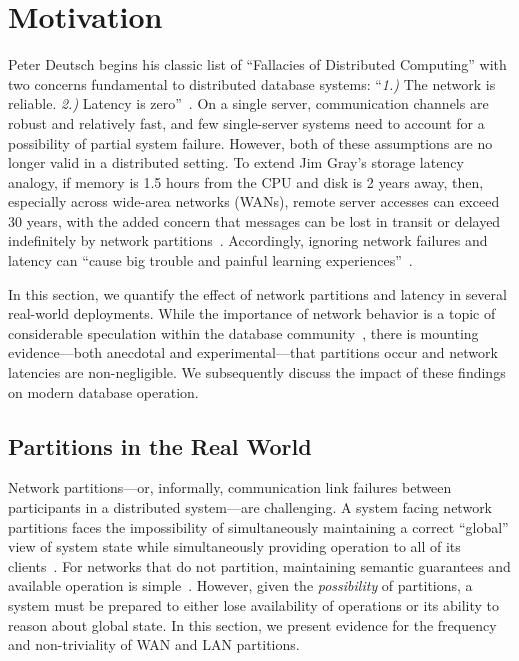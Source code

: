
\section{Motivation}
\label{sec:motivation}

Peter Deutsch begins his classic list of ``Fallacies of Distributed
Computing'' with two concerns fundamental to distributed database
systems: ``\textit{1.)}  The network is reliable. \textit{2.)} Latency
is zero''~\cite{fallacies-deutsch}. On a single server, communication
channels are robust and relatively fast, and few single-server systems
need to account for a possibility of partial system failure. However,
both of these assumptions are no longer valid in a distributed
setting. To extend Jim Gray's storage latency analogy, if memory is
1.5 hours from the CPU and disk is 2 years away, then, especially
across wide-area networks (WANs), remote server accesses can exceed 30
years, with the added concern that messages can be lost in transit or
delayed indefinitely by network
partitions~\cite{gray-rules}. Accordingly, ignoring network failures
and latency can ``cause big trouble and painful learning
experiences''~\cite{fallacies-deutsch}.

In this section, we quantify the effect of network partitions and
latency in several real-world deployments. While the importance of
network behavior is a topic of considerable speculation within the
database community~\cite{stonebraker2010errors}, there is mounting
evidence---both anecdotal and experimental---that partitions occur and
network latencies are non-negligible. We subsequently discuss the
impact of these findings on modern database operation.

\subsection{Partitions in the Real World}

Network partitions---or, informally, communication link failures
between participants in a distributed system---are challenging. A
system facing network partitions faces the impossibility of
simultaneously maintaining a correct ``global'' view of system state
while simultaneously providing operation to all of its
clients~\cite{davidson-survey}. For networks that do not partition,
maintaining semantic guarantees and available operation is
simple~\cite{stonebraker2010errors}. However, given the
\textit{possibility} of partitions, a system must be prepared to
either lose availability of operations or its ability to reason about
global state. In this section, we present evidence for the frequency
and non-triviality of WAN and LAN partitions.

